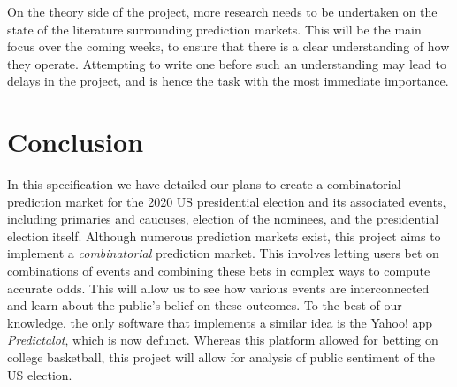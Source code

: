 \documentclass[10pt,a4paper]{article}
\theoremstyle{plain}
\theoremstyle{definition}
\begin{document}
	On the theory side of the project, more research needs to be undertaken on
	the state of the literature surrounding prediction markets. This will be
	the main focus over the coming weeks, to ensure that there is a clear
	understanding of how they operate. Attempting to write one before such an
	understanding may lead to delays in the project, and is hence the task with
	the most immediate importance.

\section{Conclusion}
	\label{sec:conclusion}

	In this specification we have detailed our plans to create a combinatorial
	prediction market for the 2020 US presidential election and its associated
	events, including primaries and caucuses, election of the nominees, and the
	presidential election itself. Although numerous prediction markets exist,
	this project aims to implement a \emph{combinatorial} prediction market.
	This involves letting users bet on combinations of events and combining
	these bets in complex ways to compute accurate odds. This will allow us to
	see how various events are interconnected and learn about the public's
	belief on these outcomes. To the best of our knowledge, the only software
	that implements a similar idea is the Yahoo! app \emph{Predictalot}, which
	is now defunct. Whereas this platform allowed for betting on college
	basketball, this project will allow for analysis of public sentiment of the
	US election.



\begin{appendices}


    
    

\end{appendices}
\end{document}
